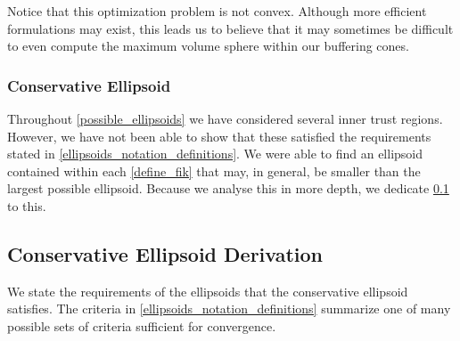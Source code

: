 \documentclass{article}
\theoremstyle{case}
\numberwithin{theorem}{subsection}
\begin{document}
Notice that this optimization problem is not convex.
Although more efficient formulations may exist, this leads us to believe that it may sometimes be difficult to even compute the maximum volume sphere within our buffering cones.

\subsubsection{Conservative Ellipsoid}
Throughout \cref{possible_ellipsoids} we have considered several inner trust regions.
However, we have not been able to show that these satisfied the requirements stated in \cref{ellipsoids_notation_definitions}.
We were able to find an ellipsoid contained within each \cref{define_fik} that may, in general, be smaller than the largest possible ellipsoid.
Because we analyse this in more depth, we dedicate \cref{conservative_ellipsoid_section} to this.

\subsection{Conservative Ellipsoid Derivation}
\label{conservative_ellipsoid_section}

We state the requirements of the ellipsoids that the conservative ellipsoid satisfies.
The criteria in \cref{ellipsoids_notation_definitions} summarize one of many possible sets of criteria sufficient for convergence.
\end{document}

